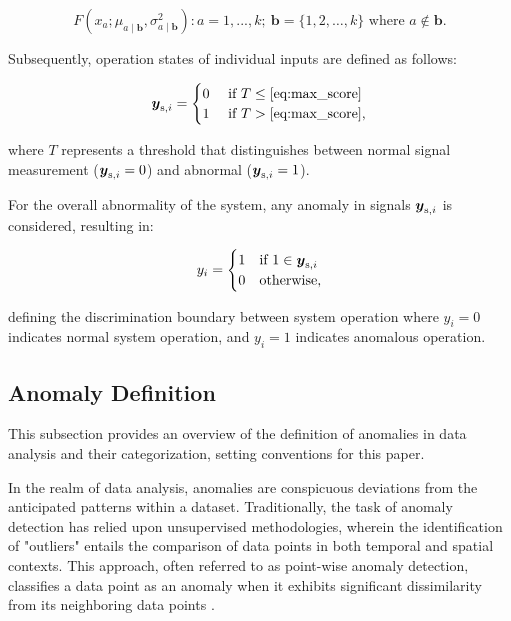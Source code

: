 
\begin{equation}
 {F(x_a; \mu_{a \mid \boldsymbol{b}}, \sigma_{a \mid \boldsymbol{b}}^2)}:a = 1,...,k;~ \boldsymbol{b} = \{1, 2, \ldots, k\} \text{ where }a \notin \boldsymbol{b} \text{.}\label{eq:max_score}
\end{equation}

Subsequently, operation states of individual inputs are defined as follows:

\begin{equation}
 \boldsymbol{y} _{\text{s}, i} =
 \begin{cases}
 0 & \text{ if } T \leq \eqref{eq:max_score}
 \\
 1 & \text{ if } T > \eqref{eq:max_score}
 \text{,}\label{eq:anomaly_signal}
 \end{cases}
\end{equation}

where $T$ represents a threshold that distinguishes between normal signal measurement ($\boldsymbol{y} _{\text{s}, i} = 0$) and abnormal ($\boldsymbol{y} _{\text{s}, i} = 1$).

For the overall abnormality of the system, any anomaly in signals $\boldsymbol{y} _{\text{s}, i}$ is considered, resulting in:

\begin{equation}
 y_i =
 \begin{cases}
 1 & \text{if } 1 \in \boldsymbol{y} _{\text{s}, i}
 \\
 0 & \text{otherwise}
 \text{,}\label{eq:anomaly}
 \end{cases}
\end{equation}


defining the discrimination boundary between system operation where $y_i = 0$ indicates normal system operation, and $y_i = 1$ indicates anomalous operation.

\subsection{Anomaly Definition}\label{AA:AnomalyDefinition}
This subsection provides an overview of the definition of anomalies in data analysis and their categorization, setting conventions for this paper.

In the realm of data analysis, anomalies are conspicuous deviations from the anticipated patterns within a dataset. Traditionally, the task of anomaly detection has relied upon unsupervised methodologies, wherein the identification of "outliers" entails the comparison of data points in both temporal and spatial contexts. This approach, often referred to as point-wise anomaly detection, classifies a data point as an anomaly when it exhibits significant dissimilarity from its neighboring data points \citep{IGLESIASVAZQUEZ2023120994}.

